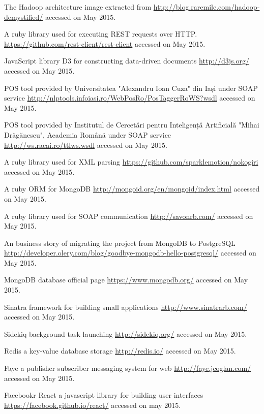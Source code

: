 \begin{thebibliography}{99999}
\singlespace\normalsize


 The Hadoop architecture image extracted from \url{http://blog.raremile.com/hadoop-demystified/} accessed on May 2015.

 A ruby library used for executing REST requests over HTTP. \url{https://github.com/rest-client/rest-client} accessed on May 2015.

 JavaScript library D3 for constructing data-driven documents \url{http://d3js.org/} accessed on May 2015.

 POS tool provided by Universitatea "Alexandru Ioan Cuza" din Iași under SOAP service \url{http://nlptools.infoiasi.ro/WebPosRo/PosTaggerRoWS?wsdl} accessed on May 2015.

 POS tool provided by Institutul de Cercetări pentru Inteligență Artificială "Mihai Drăgănescu", Academia Română under SOAP service \url{http://ws.racai.ro/ttlws.wsdl} accessed on May 2015.

 A ruby library used for XML parsing \url{https://github.com/sparklemotion/nokogiri} accessed on May 2015.

 A ruby ORM for MongoDB \url{http://mongoid.org/en/mongoid/index.html} accessed on May 2015.

 A ruby library used for SOAP communication \url{http://savonrb.com/} accessed on May 2015.

 An business story of migrating the project from MongoDB to PostgreSQL \url{http://developer.olery.com/blog/goodbye-mongodb-hello-postgresql/} accessed on May 2015.

 MongoDB database official page \url{https://www.mongodb.org/} accessed on May 2015.

 Sinatra framework for building small applications \url{http://www.sinatrarb.com/} accessed on May 2015.

 Sidekiq background task launching \url{http://sidekiq.org/} accessed on May 2015.

 Redis a key-value database storage \url{http://redis.io/} accessed on May 2015.

 Faye a publisher subscriber messaging system for web \url{http://faye.jcoglan.com/} accessed on May 2015.

 Facebookr React a javascript library for building user interfaces \url{https://facebook.github.io/react/} accessed on may 2015.

\end{thebibliography}

